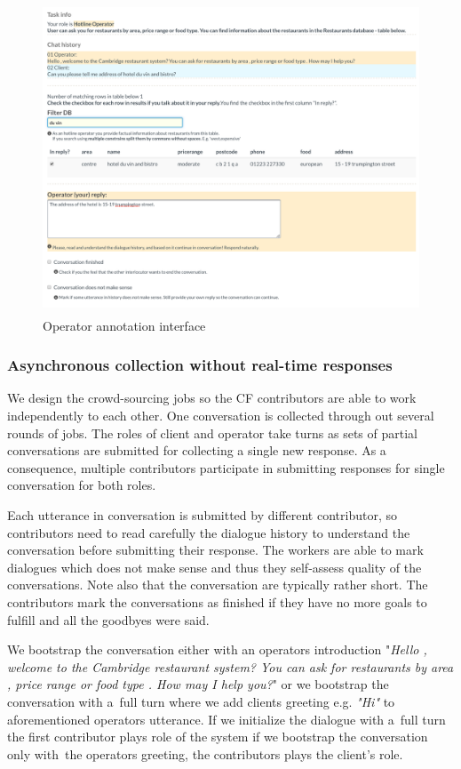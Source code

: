 \documentclass[runningheads,a4paper]{llncs}
\begin{document}
\begin{figure}
\begin{center}
\includegraphics[height=25em]{gui-annotators-system}
\caption{Operator annotation interface}
\end{center}
\vspace{-0.80em}
\label{fig:operator}
\end{figure}

\subsubsection{Asynchronous collection without real-time responses}
\label{sec:async}
We design the crowd-sourcing jobs so the CF contributors are able to work independently to each other.
One conversation is collected through out several rounds of jobs.
The roles of client and operator take turns as sets of partial conversations are submitted for collecting a single new response.
As a consequence, multiple contributors participate in submitting responses for single conversation for both roles.

Each utterance in conversation is submitted by different contributor, so contributors need to read carefully the dialogue history to understand the conversation before submitting their response.
The workers are able to mark dialogues which does not make sense and thus they self-assess quality of the conversations.
Note also that the conversation are typically rather short.
The contributors mark the conversations as finished if they have no more goals to fulfill and all the goodbyes were said.

We bootstrap the conversation either with an operators introduction "{\it Hello , welcome to the Cambridge restaurant system? You can ask for restaurants by area , price range or food type . How may I help you?}" or we bootstrap the conversation with a~full turn where we add clients greeting e.g. {\it "Hi"} to aforementioned operators utterance.
If we initialize the dialogue with a~full turn the first contributor plays role of the system if we bootstrap the conversation only with~the operators greeting, the contributors plays the client's role.
\end{document}
